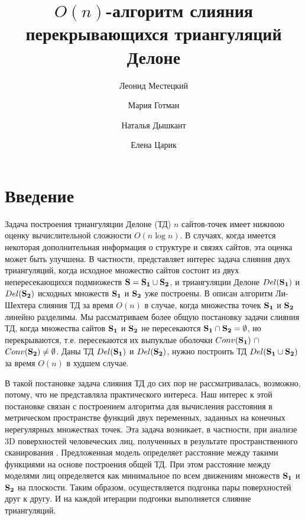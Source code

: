 \documentclass[12pt]{article}
\title{$O(n)$-алгоритм слияния перекрывающихся триангуляций Делоне}
\author{Леонид Местецкий}
\author{Мария Готман}
\affil{ВМК МГУ}
\author{Наталья Дышкант}
\affil{НИВЦ}
\author{Елена Царик}
\affil{ТвГУ}
\date{}
\begin{document}
\maketitle


\section{Введение}
Задача построения триангуляции Делоне (ТД) $n$ сайтов-точек имеет нижнюю оценку вычислительной сложности  $O(n\log n)$.
В случаях, когда имеется некоторая дополнительная информация о структуре и связях сайтов, эта оценка может быть улучшена.
В частности, представляет интерес задача слияния двух триангуляций, когда исходное множество сайтов состоит из двух непересекающихся подмножеств $\bf{S} = \bf{S_1} \cup \bf{S_2}$, и триангуляции Делоне $Del(\bf{S_1})$ и $Del(\bf{S_2})$  исходных множеств $\bf{S_1}$ и $\bf{S_2}$ уже построены.
В \cite{Lee} описан алгоритм Ли-Шехтера слияния ТД за время $O(n)$ в случае, когда множества точек $\bf{S_1}$ и $\bf{S_2}$ линейно разделимы.
Мы рассматриваем более общую постановку задачи слияния ТД, когда множества сайтов $\bf{S_1}$ и $\bf{S_2}$ не пересекаются $\bf{S_1} \cap \bf{S_2} = \emptyset$, но перекрываются, т.е. пересекаются их выпуклые оболочки
$Conv(\bf{S_1})~\cap$ $Conv(\bf{S_2}) \ne \emptyset$.
Даны ТД $Del(\bf{S_1})$ и $Del(\bf{S_2})$, нужно построить ТД
$Del(\bf{S_1} \cup \bf{S_2})$ за время $O(n)$ в худшем случае.

В такой постановке задача слияния ТД до сих пор не рассматривалась, возможно, потому, что не представляла практического интереса.
Наш интерес к этой постановке связан с построением алгоритма для вычисления расстояния в метрическом пространстве функций двух переменных, заданных на конечных нерегулярных множествах точек.
Эта задача возникает, в частности, при анализе 3D поверхностей человеческих лиц, полученных в результате пространственного сканирования \cite{Dyshkant}.
Предложенная модель определяет расстояние между такими функциями на основе построения общей ТД.
При этом расстояние между моделями лиц определяется как минимальное по всем движениям множеств $\bf{S_1}$ и $\bf{S_2}$ на плоскости.
Таким образом, осуществляется подгонка пары поверхностей друг к другу.
И на каждой итерации подгонки выполняется слияние триангуляций.
\end{document}
